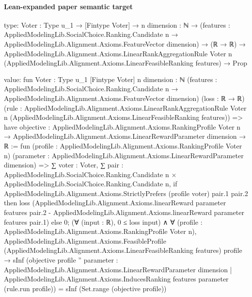 \documentclass[10pt]{article}
\begin{document}
\paragraph{Lean-expanded paper semantic target}
\begin{ReviewVerbatim}
type:
{Voter : Type u_1} →
  [Fintype Voter] →
    {n dimension : ℕ} →
      (features :
          AppliedModelingLib.SocialChoice.Ranking.Candidate n →
            AppliedModelingLib.Alignment.Axioms.FeatureVector dimension) →
        (ℝ → ℝ) →
          AppliedModelingLib.Alignment.Axioms.LinearRankAggregationRule Voter n
              (AppliedModelingLib.Alignment.Axioms.LinearFeasibleRanking features) →
            Prop

value:
fun {Voter : Type u_1} [Fintype Voter] {n dimension : ℕ}
    (features :
      AppliedModelingLib.SocialChoice.Ranking.Candidate n → AppliedModelingLib.Alignment.Axioms.FeatureVector dimension)
    (loss : ℝ → ℝ)
    (rule :
      AppliedModelingLib.Alignment.Axioms.LinearRankAggregationRule Voter n
        (AppliedModelingLib.Alignment.Axioms.LinearFeasibleRanking features)) =>
  have objective :
    AppliedModelingLib.Alignment.Axioms.RankingProfile Voter n →
      AppliedModelingLib.Alignment.Axioms.LinearRewardParameter dimension → ℝ :=
    fun (profile : AppliedModelingLib.Alignment.Axioms.RankingProfile Voter n)
      (parameter : AppliedModelingLib.Alignment.Axioms.LinearRewardParameter dimension) =>
    ∑ voter : Voter,
      ∑ pair :
        AppliedModelingLib.SocialChoice.Ranking.Candidate n × AppliedModelingLib.SocialChoice.Ranking.Candidate n,
        if AppliedModelingLib.Alignment.Axioms.StrictlyPrefers (profile voter) pair.1 pair.2 then
          loss
            (AppliedModelingLib.Alignment.Axioms.linearReward parameter features pair.2 -
              AppliedModelingLib.Alignment.Axioms.linearReward parameter features pair.1)
        else 0;
  (∀ (input : ℝ), 0 ≤ loss input) ∧
    ∀ (profile : AppliedModelingLib.Alignment.Axioms.RankingProfile Voter n),
      AppliedModelingLib.Alignment.Axioms.FeasibleProfile
          (AppliedModelingLib.Alignment.Axioms.LinearFeasibleRanking features) profile →
        sInf
            (objective profile ''
              {parameter : AppliedModelingLib.Alignment.Axioms.LinearRewardParameter dimension |
                AppliedModelingLib.Alignment.Axioms.InducesRanking features parameter (rule.run profile)}) =
          sInf (Set.range (objective profile))
\end{ReviewVerbatim}
\end{document}
